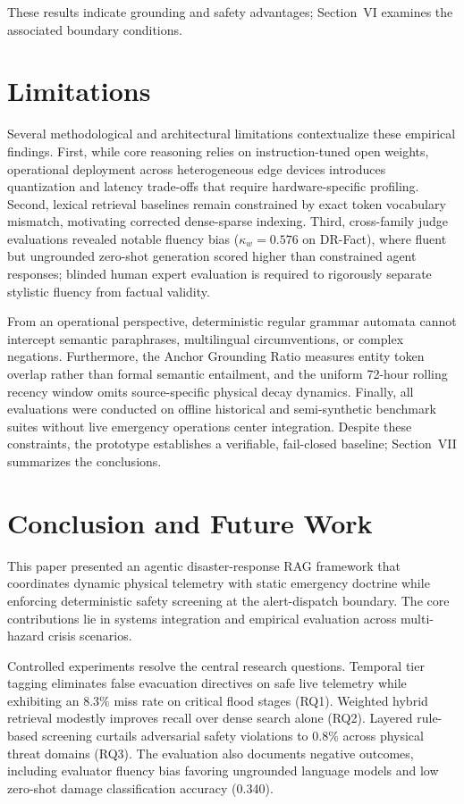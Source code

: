 \documentclass[conference]{IEEEtran}
\begin{document}
These results indicate grounding and safety advantages; Section~VI examines the associated boundary conditions.

\section{Limitations}
\label{sec:threats}
Several methodological and architectural limitations contextualize these empirical findings. First, while core reasoning relies on instruction-tuned open weights, operational deployment across heterogeneous edge devices introduces quantization and latency trade-offs that require hardware-specific profiling. Second, lexical retrieval baselines remain constrained by exact token vocabulary mismatch, motivating corrected dense-sparse indexing. Third, cross-family judge evaluations revealed notable fluency bias ($\kappa_w = 0.576$ on DR-Fact), where fluent but ungrounded zero-shot generation scored higher than constrained agent responses; blinded human expert evaluation is required to rigorously separate stylistic fluency from factual validity.

From an operational perspective, deterministic regular grammar automata cannot intercept semantic paraphrases, multilingual circumventions, or complex negations. Furthermore, the Anchor Grounding Ratio measures entity token overlap rather than formal semantic entailment, and the uniform 72-hour rolling recency window omits source-specific physical decay dynamics. Finally, all evaluations were conducted on offline historical and semi-synthetic benchmark suites without live emergency operations center integration. Despite these constraints, the prototype establishes a verifiable, fail-closed baseline; Section~VII summarizes the conclusions.

\section{Conclusion and Future Work}
This paper presented an agentic disaster-response RAG framework that coordinates dynamic physical telemetry with static emergency doctrine while enforcing deterministic safety screening at the alert-dispatch boundary. The core contributions lie in systems integration and empirical evaluation across multi-hazard crisis scenarios.

Controlled experiments resolve the central research questions. Temporal tier tagging eliminates false evacuation directives on safe live telemetry while exhibiting an 8.3\% miss rate on critical flood stages (RQ1). Weighted hybrid retrieval modestly improves recall over dense search alone (RQ2). Layered rule-based screening curtails adversarial safety violations to 0.8\% across physical threat domains (RQ3). The evaluation also documents negative outcomes, including evaluator fluency bias favoring ungrounded language models and low zero-shot damage classification accuracy (0.340).
\end{document}
